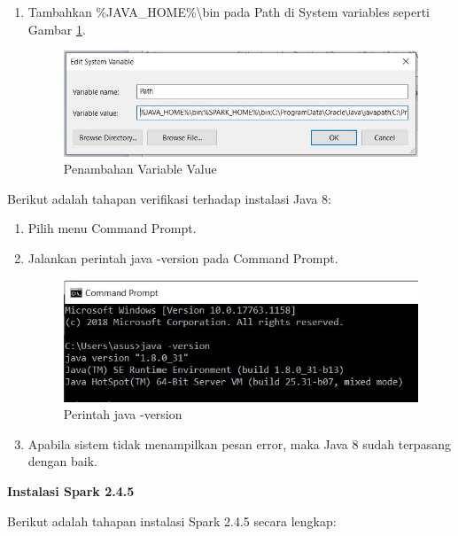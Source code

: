 \documentclass[a4paper,twoside]{article}
\begin{document}
\begin{enumerate}
\begin{enumerate}
\item Tambahkan \textsf{\%JAVA\_HOME\%\textbackslash bin}  pada Path di System variables seperti Gambar \ref{fig:spark_instal_5}.

\begin{figure}[H]
	\centering
	\includegraphics[scale=0.8]{spark_instal_5}
	\caption{Penambahan Variable Value}
	\label{fig:spark_instal_5}
\end{figure}


\end{enumerate}

\noindent Berikut adalah tahapan verifikasi terhadap instalasi Java 8:

\begin{enumerate}

\item Pilih menu Command Prompt.

\item Jalankan perintah java -version pada Command Prompt.

\begin{figure}[H]
	\centering
	\includegraphics[scale=0.8]{instalasi_java}
	\caption{Perintah java -version}
	\label{fig:instalasi_java}
\end{figure}

\item Apabila sistem tidak menampilkan pesan error, maka Java 8 sudah terpasang dengan baik.

\end{enumerate}

\textbf{Instalasi Spark 2.4.5}

Berikut adalah tahapan instalasi Spark 2.4.5 secara lengkap:


\end{enumerate}
\end{document}
